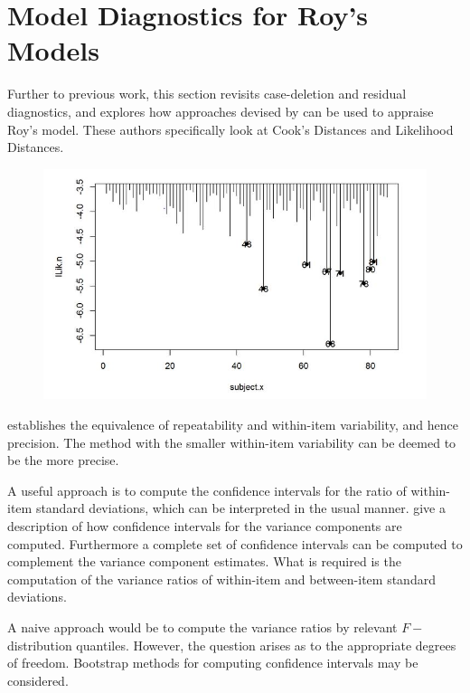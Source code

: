 \documentclass[12pt, a4paper]{report}
\theoremstyle{definition}
\theoremstyle{remark}
\begin{document}
\section{Model Diagnostics for Roy's Models}

Further to previous work, this section revisits case-deletion and residual diagnostics, and explores how approaches devised by  \citet{Galecki} can be used to appraise Roy's model. These authors specifically look at Cook's Distances and Likelihood Distances.
%	





\begin{figure}[h!]
	\centering
	\includegraphics[width=0.7\linewidth]{images/LogLik-JS-Roy}
	\caption{}
	\label{fig:LogLik-JS-Roy}
\end{figure}





\citet{ARoy2009} establishes the equivalence of repeatability and within-item variability, and hence precision.  The method with the smaller within-item variability can be deemed to be the more precise.

A useful approach is to compute the confidence intervals for the ratio of within-item standard deviations, which can be interpreted in the usual manner. \citet[pg 93-95]{PB} give a description of how confidence intervals for the variance components are computed. Furthermore a complete set of confidence intervals can be computed to complement the variance component estimates. What is required is the computation of the variance ratios of within-item and between-item standard deviations.

A naive approach would be to compute the variance ratios by relevant $F-$distribution quantiles. However, the question arises as to the appropriate degrees of freedom. Bootstrap methods for computing confidence intervals may be considered.
\end{document}
